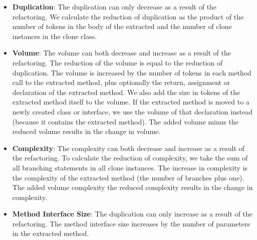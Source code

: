 \begin{itemize}
\item \textbf{Duplication}: The duplication can only decrease as a result of the refactoring. We calculate the reduction of duplication as the product of the number of tokens in the body of the extracted and the number of clone instances in the clone class.
\item \textbf{Volume}: The volume can both decrease and increase as a result of the refactoring. The reduction of the volume is equal to the reduction of duplication. The volume is increased by the number of tokens in each method call to the extracted method, plus optionally the return, assignment or declaration of the extracted method. We also add the size in tokens of the extracted method itself to the volume. If the extracted method is moved to a newly created class or interface, we use the volume of that declaration instead (because it contains the extracted method). The added volume minus the reduced volume results in the change in volume.
\item \textbf{Complexity}: The complexity can both decrease and increase as a result of the refactoring. To calculate the reduction of complexity, we take the sum of all branching statements in all clone instances. The increase in complexity is the complexity of the extracted method (the number of branches plus one). The added volume complexity the reduced complexity results in the change in complexity.
\item \textbf{Method Interface Size}: The duplication can only increase as a result of the refactoring. The method interface size increases by the number of parameters in the extracted method.
\end{itemize}

